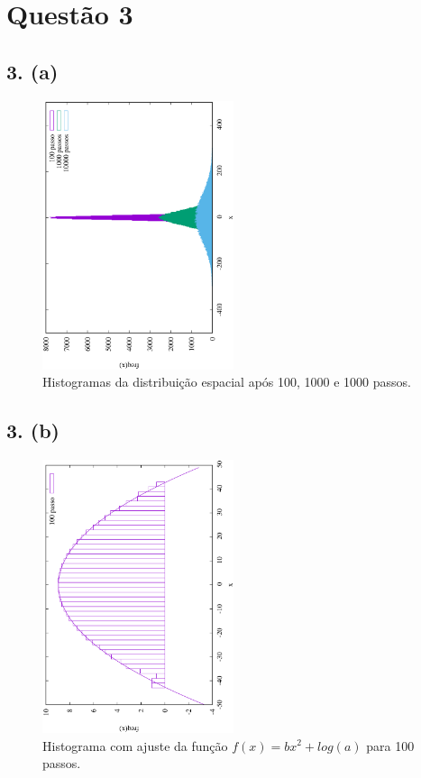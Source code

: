 \documentclass[brazilian, 12pt, a4paper, final]{article}
\begin{document}
\section*{Questão 3}
\subsection*{3. (a)}
\begin{figure}[htbp]
  \centering
  \includegraphics[width=0.5\textwidth,angle=-90]{Q3/histQ3.eps}
  \caption{Histogramas da distribuição espacial após 100, 1000 e 1000 passos.}
\end{figure} 

\subsection*{3. (b)}

\begin{figure}[htbp]
  \centering
  \includegraphics[width=0.5\textwidth,angle=-90]{Q3/log100.eps}
  \caption{Histograma com ajuste da função $f(x)=bx^2+log(a)$ para 100 passos.}
\end{figure} 
\end{document}
